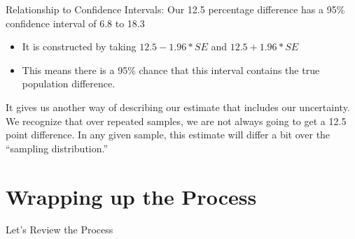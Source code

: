 \documentclass[
  letterpaper,
  DIV=11,
  numbers=noendperiod]{scrreprt}
\providecommand{\tightlist}{%
  \setlength{\itemsep}{0pt}\setlength{\parskip}{0pt}}\usepackage{longtable,booktabs,array}
\begin{document}
Relationship to Confidence Intervals: Our 12.5 percentage difference has
a 95\% confidence interval of 6.8 to 18.3

\begin{itemize}
\tightlist
\item
  It is constructed by taking \(12.5 - 1.96*SE\) and \(12.5 + 1.96*SE\)
\item
  This means there is a 95\% chance that this interval contains the true
  population difference.
\end{itemize}

It gives us another way of describing our estimate that includes our
uncertainty. We recognize that over repeated samples, we are not always
going to get a 12.5 point difference. In any given sample, this estimate
will differ a bit over the ``sampling distribution.''

\hypertarget{wrapping-up-the-process}{%
\section{Wrapping up the Process}\label{wrapping-up-the-process}}

Let's Review the Process
\end{document}
